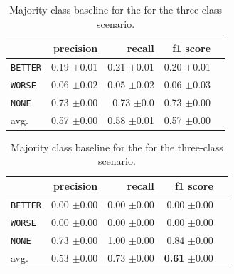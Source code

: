 \begin{table}[!htb]
	\begin{minipage}{.5\linewidth}
		\caption{Random (stratified) baseline for the three-class scenario.}
		\label{tbl:3stratifiedbaseline}
		\centering
		      
		\begin{tabularx}{0.97\linewidth}{Xrrrr}
			\toprule
			                & precision                    & recall                       & f1 score                     \\ \midrule 
			\texttt{BETTER} & 0.19 \scriptsize{$\pm$0.01} & 0.21 \scriptsize{$\pm$0.01} & 0.20 \scriptsize{$\pm$0.01} \\ 
			\texttt{WORSE}  & 0.06 \scriptsize{$\pm$0.02} & 0.05 \scriptsize{$\pm$0.02} & 0.06 \scriptsize{$\pm$0.03} \\ 
			\texttt{NONE}   & 0.73 \scriptsize{$\pm$0.00}  & 0.73 \scriptsize{$\pm$0.0} & 0.73 \scriptsize{$\pm$0.00} \\ 
			avg.         & 0.57 \scriptsize{$\pm$0.00} & 0.58 \scriptsize{$\pm$0.01} & 0.57 \scriptsize{$\pm$0.00} \\ 
			\bottomrule
		\end{tabularx} 
		
	\end{minipage}%
	\begin{minipage}{.5\linewidth}
		\centering
		\caption{Majority class baseline for the  for the three-class scenario.}
		\label{tbl:3majoritybaseline}
		\begin{tabularx}{0.97\linewidth}{Xrrrr}
			\toprule
			                & precision                    & recall                       & f1 score                                    \\ \midrule 
			\texttt{BETTER} & 0.00 \scriptsize{$\pm$0.00} & 0.00 \scriptsize{$\pm$0.00} & 0.00 \scriptsize{$\pm$0.00}                \\ 
			\texttt{WORSE}  & 0.00 \scriptsize{$\pm$0.00} & 0.00 \scriptsize{$\pm$0.00} & 0.00 \scriptsize{$\pm$0.00}                \\ 
			\texttt{NONE}   & 0.73 \scriptsize{$\pm$0.00}     & 1.00 \scriptsize{$\pm$0.00} & 0.84 \scriptsize{$\pm$0.00}                \\ 
			avg.         & 0.53 \scriptsize{$\pm$0.00} & 0.73 \scriptsize{$\pm$0.00} & \textbf{0.61} \scriptsize{$\pm$0.00} \\ 
			\bottomrule
		\end{tabularx}
	\end{minipage} 
\end{table}



